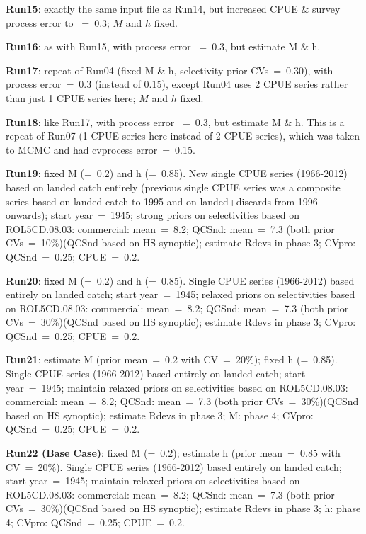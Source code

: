 {\bf Run15}: exactly the same input file as Run14, but increased CPUE \& survey process error to ~=~0.3; $M$ and $h$ fixed. \newline

{\bf Run16}: as with Run15, with process error ~=~0.3, but estimate M \& h. \newline

{\bf Run17}: repeat of Run04 (fixed M \& h, selectivity prior CVs~=~0.30), with process error~=~0.3 (instead of 0.15), except Run04 uses 2 CPUE series rather than just 1 CPUE series here; $M$ and $h$ fixed. \newline

{\bf Run18}: like Run17, with process error ~=~0.3, but estimate M \& h.  This is a repeat of Run07 (1 CPUE series here instead of 2 CPUE series), which was taken to MCMC and had cvprocess error~=~0.15. \newline

{\bf Run19}: fixed M (=~0.2) and h (=~0.85). New single CPUE series (1966-2012) based on landed catch entirely (previous single CPUE series was a composite series based on landed catch to 1995 and on landed+discards from 1996 onwards); start year~=~1945; strong priors on selectivities based on ROL5CD.08.03: commercial: mean~=~8.2; QCSnd: mean~=~7.3 (both prior CVs~=~10\%)(QCSnd based on HS synoptic); estimate Rdevs in phase 3; CVpro: QCSnd~=~0.25; CPUE~=~0.2. \newline

{\bf Run20}: fixed M (=~0.2) and h (=~0.85). Single CPUE series (1966-2012) based entirely on landed catch; start year~=~1945; relaxed priors on selectivities based on ROL5CD.08.03: commercial: mean~=~8.2; QCSnd: mean~=~7.3 (both prior CVs~=~30\%)(QCSnd based on HS synoptic); estimate Rdevs in phase 3; CVpro: QCSnd~=~0.25; CPUE~=~0.2. \newline

{\bf Run21}: estimate M (prior mean~=~0.2 with CV~=~20\%); fixed h (=~0.85).  Single CPUE series (1966-2012) based entirely on landed catch; start year~=~1945; maintain relaxed priors on selectivities based on ROL5CD.08.03: commercial: mean~=~8.2; QCSnd: mean~=~7.3 (both prior CVs~=~30\%)(QCSnd based on HS synoptic); estimate Rdevs in phase 3; M: phase 4; CVpro: QCSnd~=~0.25; CPUE~=~0.2. \newline

{\bf Run22 (Base Case)}: fixed M (=~0.2); estimate h (prior mean~=~0.85 with CV~=~20\%).  Single CPUE series (1966-2012) based entirely on landed catch; start year~=~1945; maintain relaxed priors on selectivities based on ROL5CD.08.03: commercial: mean~=~8.2; QCSnd: mean~=~7.3 (both prior CVs~=~30\%)(QCSnd based on HS synoptic); estimate Rdevs in phase 3; h: phase 4; CVpro: QCSnd~=~0.25; CPUE~=~0.2. \newline

